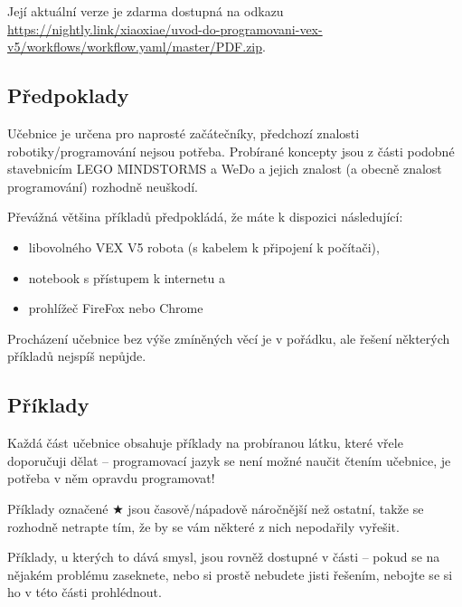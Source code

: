 Její aktuální verze je zdarma dostupná na odkazu \href{https://nightly.link/xiaoxiae/uvod-do-programovani-vex-v5/workflows/workflow.yaml/master/PDF.zip
}{https://nightly.link/xiaoxiae/uvod-do-programovani-vex-v5/workflows/workflow.yaml/master/PDF.zip}.

\subsection{Předpoklady}
Učebnice je určena pro naprosté začátečníky, předchozí znalosti robotiky/programování nejsou potřeba. Probírané koncepty jsou z části podobné stavebnicím LEGO MINDSTORMS a WeDo a jejich znalost (a obecně znalost programování) rozhodně neuškodí.

Převážná většina příkladů předpokládá, že máte k dispozici následující:
\begin{itemize}
	\item libovolného VEX V5 robota (s kabelem k připojení k počítači),
	\item notebook s přístupem k internetu a
	\item prohlížeč FireFox nebo Chrome
\end{itemize}

Procházení učebnice bez výše zmíněných věcí je v pořádku, ale řešení některých příkladů nejspíš nepůjde.

\subsection{Příklady}
Každá část učebnice obsahuje příklady na probíranou látku, které vřele doporučuji dělat -- programovací jazyk se není možné naučit čtením učebnice, je potřeba v něm opravdu programovat!

Příklady označené $\bigstar$ jsou časově/nápadově náročnější než ostatní, takže se rozhodně netrapte tím, že by se vám některé z nich nepodařily vyřešit.

Příklady, u kterých to dává smysl, jsou rovněž dostupné v části  -- pokud se na nějakém problému zaseknete, nebo si prostě nebudete jisti řešením, nebojte se si ho v této části prohlédnout.

\errata

\newpage

\setcounter{secnumdepth}{3}

\newpage

\newpage

\newpage

\newpage

\newpage

\newpage
\setcounter{secnumdepth}{0}

